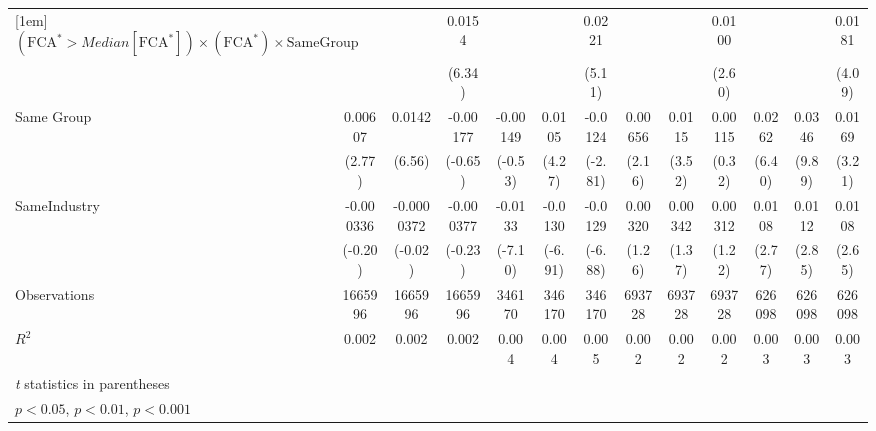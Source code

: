 {\begin{tabular}{l*{12}{c}}
[1em]
 $ (\text{FCA}^* > Median[\text{FCA}^*]) \times  (\text{FCA}^*) \times {\text{SameGroup}}$&                  &                  &   0.0154\sym{***}&                  &                  &   0.0221\sym{***}&                  &                  &   0.0100\sym{*}  &                  &                  &   0.0181\sym{***}\\
                &                  &                  &   (6.34)         &                  &                  &   (5.11)         &                  &                  &   (2.60)         &                  &                  &   (4.09)         \\
[1em]
Same Group      &  0.00607\sym{**} &   0.0142\sym{***}& -0.00177         & -0.00149         &   0.0105\sym{***}&  -0.0124\sym{**} &  0.00656\sym{*}  &   0.0115\sym{***}&  0.00115         &   0.0262\sym{***}&   0.0346\sym{***}&   0.0169\sym{**} \\
                &   (2.77)         &   (6.56)         &  (-0.65)         &  (-0.53)         &   (4.27)         &  (-2.81)         &   (2.16)         &   (3.52)         &   (0.32)         &   (6.40)         &   (9.89)         &   (3.21)         \\
[1em]
SameIndustry    &-0.000336         &-0.0000372         &-0.000377         &  -0.0133\sym{***}&  -0.0130\sym{***}&  -0.0129\sym{***}&  0.00320         &  0.00342         &  0.00312         &   0.0108\sym{**} &   0.0112\sym{**} &   0.0108\sym{**} \\
                &  (-0.20)         &  (-0.02)         &  (-0.23)         &  (-7.10)         &  (-6.91)         &  (-6.88)         &   (1.26)         &   (1.37)         &   (1.22)         &   (2.77)         &   (2.85)         &   (2.65)         \\
\hline
Observations    &  1665996         &  1665996         &  1665996         &   346170         &   346170         &   346170         &   693728         &   693728         &   693728         &   626098         &   626098         &   626098         \\
\(R^{2}\)       &    0.002         &    0.002         &    0.002         &    0.004         &    0.004         &    0.005         &    0.002         &    0.002         &    0.002         &    0.003         &    0.003         &    0.003         \\
\hline\hline
\multicolumn{13}{l}{\footnotesize \textit{t} statistics in parentheses}\\
\multicolumn{13}{l}{\footnotesize \sym{*} \(p<0.05\), \sym{**} \(p<0.01\), \sym{***} \(p<0.001\)}\\
\end{tabular}
}
